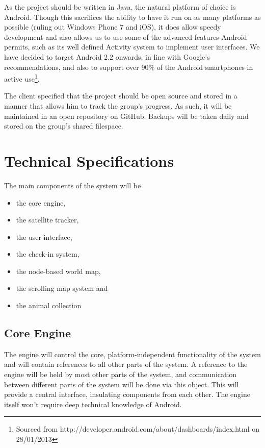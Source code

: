 \documentclass[12pt,a4paper,twoside]{article}
\begin{document}
As the project should be written in Java, the natural platform of choice is Android.
Though this sacrifices the ability to have it run on as many platforms as possible (ruling out Windows Phone 7 and iOS), it does allow speedy development and also allows us to use some of the advanced features Android permits, such as its well defined Activity system to implement user interfaces.
We have decided to target Android 2.2 onwards, in line with Google's recommendations, and also to support over 90\% of the Android smartphones in active use\footnote{Sourced from http://developer.android.com/about/dashboards/index.html on 28/01/2013}.

The client specified that the project should be open source and stored in a manner that allows him to track the group's progress.
As such, it will be maintained in an open repository on GitHub.
Backups will be taken daily and stored on the group's shared filespace.

\section{Technical Specifications}
The main components of the system will be
\begin{itemize}
\item the core engine,
\item the satellite tracker,
\item the user interface,
\item the check-in system,
\item the node-based world map,
\item the scrolling map system and
\item the animal collection
\end{itemize}

\subsection{Core Engine}
The engine will control the core, platform-independent functionality of the system and will contain references to all other parts of the system.
A reference to the engine will be held by most other parts of the system, and communication between different parts of the system will be done via this object.
This will provide a central interface, insulating components from each other.
The engine itself won't require deep technical knowledge of Android.
\end{document}
